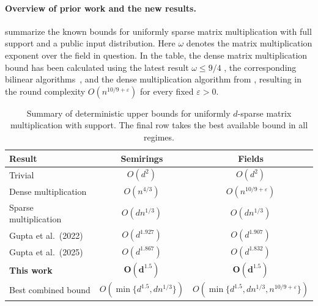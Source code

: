 \paragraph{Overview of prior work and the new results.}
 summarize
the known bounds for uniformly sparse matrix multiplication with full
support and a public input distribution. Here $\omega$ denotes the
matrix multiplication exponent over the field in question. In the table, the dense matrix multiplication bound has been calculated using the latest result $\omega\le9/4$ \cite{openai-2026-an-upper-bound-of-9-4-for-the-matrix,amanov-van-den-berg-zuiddam-2026-multiplying-matrices-via-polynomials}, the corresponding bilinear algorithms~\cite{pass-2026-matrix-multiplication-from-polynomial-packings}, and the dense multiplication algorithm from \cite{censor-hillel-kaski-etal-2019-algebraic-methods-in-the}, resulting in the round complexity
$O(n^{10/9+\varepsilon})$ for every fixed $\varepsilon>0$.



\begin{table}[!ht]
	\centering
	\small
	\setlength{\tabcolsep}{4pt}
	\renewcommand{\arraystretch}{1.22}
	\begin{tabular}{@{}lcc@{}}
		\toprule
		Result & Semirings & Fields \\
		\midrule
		Trivial & $O(d^2)$ & $O(d^2)$ \\
		Dense multiplication~\cite{censor-hillel-kaski-etal-2019-algebraic-methods-in-the}
		& $O(n^{4/3})$ & $O(n^{10/9+\varepsilon})$ \\
		Sparse multiplication~\cite{censor-hillel-dory-etal-2021-fast-approximate-shortest}
		& $O(dn^{1/3})$ & $O(dn^{1/3})$ \\
		Gupta et al.\ (2022)~\cite{gupta-hirvonen-etal-2022-sparse-matrix-multiplication}
		& $O(d^{1.927})$ & $O(d^{1.907})$ \\
		Gupta et al.\ (2025)~\cite{gupta-korhonen-etal-2025-low-bandwidth-matrix}
		& $O(d^{1.867})$ & $O(d^{1.832})$ \\
		\textbf{This work} & $\boldsymbol{O(d^{1.5})}$ & $\boldsymbol{O(d^{1.5})}$ \\
		\midrule
		Best combined bound
		& $O(\min\{d^{1.5},dn^{1/3}\})$
		& $O(\min\{d^{1.5},dn^{1/3},n^{10/9+\varepsilon}\})$ \\
		\bottomrule
	\end{tabular}
	\caption{Summary of deterministic upper bounds for uniformly $d$-sparse matrix multiplication with support. The final row takes the best available bound in all regimes.}
	\label{tab:us-full-support-bounds}
\end{table}

